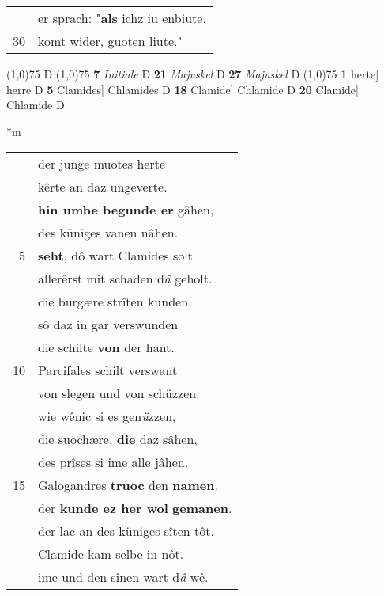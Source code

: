 \documentclass[8pt,a4paper,notitlepage]{article}
\begin{document}
\begin{table}[ht]
\begin{minipage}[t]{0.5\linewidth}
\begin{tabular}{rl}
 & er sprach: "\textbf{als} ichz iu enbiute,\\ 
30 & komt wider, guoten liute."\\ 
\end{tabular}
\scriptsize
\line(1,0){75} \newline
D \newline
\line(1,0){75} \newline
\textbf{7} \textit{Initiale} D  \textbf{21} \textit{Majuskel} D  \textbf{27} \textit{Majuskel} D  \newline
\line(1,0){75} \newline
\textbf{1} herte] herre D \textbf{5} Clamides] Chlamides D \textbf{18} Clamide] Chlamide D \textbf{20} Clamide] Chlamide D \newline
\end{minipage}
\hspace{0.5cm}
\begin{minipage}[t]{0.5\linewidth}
\small
\begin{center}*m
\end{center}
\begin{tabular}{rl}
 & der junge muotes herte\\ 
 & kêrte an daz ungeverte.\\ 
 & \textbf{hin umbe begunde er} gâhen,\\ 
 & des küniges vanen nâhen.\\ 
5 & \textbf{seht}, dô wart Clamides solt\\ 
 & allerêrst mit schaden d\textit{â} geholt.\\ 
 & die burgære strîten kunden,\\ 
 & sô daz in gar verswunden\\ 
 & die schilte \textbf{von} der hant.\\ 
10 & Parcifales schilt verswant\\ 
 & von slegen und von schüzzen.\\ 
 & wie wênic si es gen\textit{ü}zzen,\\ 
 & die suochære, \textbf{die} daz sâhen,\\ 
 & des prîses si ime alle jâhen.\\ 
15 & Galogandres \textbf{truoc} den \textbf{namen}.\\ 
 & der \textbf{kunde ez her wol} \textbf{gemanen}.\\ 
 & der lac an des küniges sîten tôt.\\ 
 & Clamide kam selbe in nôt.\\ 
 & ime und den sînen wart d\textit{â} wê.\\ 

\end{tabular}
\end{minipage}
\end{table}
\end{document}
